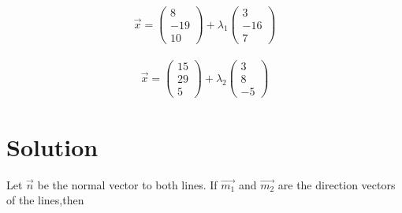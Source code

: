 \documentclass[journal,12pt,twocolumn]{IEEEtran}
\begin{document}
\begin{align}   
\vec{x} =\begin{pmatrix} 8\\ -19\\ 10\end{pmatrix} + \lambda_1
	\begin{pmatrix} 3 \\-16\\ 7\end{pmatrix} 
\end{align}

\begin{align} 
 \vec{x} =\begin{pmatrix}15\\ 29\\ 5\end{pmatrix} + \lambda_2
	\begin{pmatrix} 3 \\8\\ -5\end{pmatrix} 
\end{align}
\section{Solution}
	Let $\vec{n}$ be the normal vector to both lines. If $\vec{m_1}$ and $\vec{m_2}$ are the direction vectors of the lines,then
\par
\end{document}
